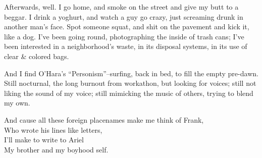 Afterwards, well. I go home, and smoke on the street and give my butt to a beggar. I drink a yoghurt, and watch a guy go crazy, just screaming drunk in another man's face. Spot someone squat, and shit on the pavement and kick it, like a dog. I've been going round, photographing the inside of trash cans; I've been interested in a neighborhood's waste, in its disposal systems, in its use of clear \& colored bags.


And I find O'Hara's ``Personism''--surfing, back in bed, to fill the empty pre-dawn. Still nocturnal, the long burnout from workathon, but looking for voices; still not liking the sound of my voice; still mimicking the music of others, trying to blend my own.

And cause all these foreign placenames make me think of Frank, \\
Who wrote his lines like letters, \\
I'll make to write to Ariel \\
My brother and my boyhood self.